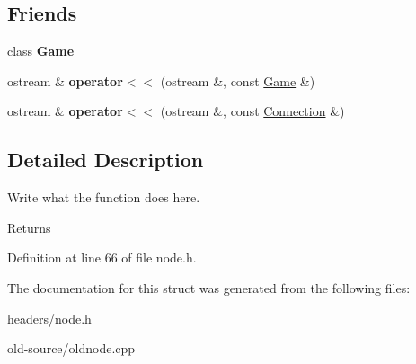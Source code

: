 \subsection*{Friends}
\begin{DoxyCompactItemize}
\item 
\hypertarget{classNode_aa2fab026580d6f14280c2ffb8063a314}{class {\bfseries Game}}\label{classNode_aa2fab026580d6f14280c2ffb8063a314}

\item 
\hypertarget{classNode_a7bb9176e07b6f6c73c930dba6400265f}{ostream \& {\bfseries operator$<$$<$} (ostream \&, const \hyperlink{classGame}{Game} \&)}\label{classNode_a7bb9176e07b6f6c73c930dba6400265f}

\item 
\hypertarget{classNode_a43649da031123d524f6605d2b0b4ebc8}{ostream \& {\bfseries operator$<$$<$} (ostream \&, const \hyperlink{structConnection}{Connection} \&)}\label{classNode_a43649da031123d524f6605d2b0b4ebc8}

\end{DoxyCompactItemize}


\subsection{Detailed Description}
Write what the function does here. 

\begin{DoxyReturn}{Returns}

\end{DoxyReturn}


Definition at line 66 of file node.\+h.



The documentation for this struct was generated from the following files\+:\begin{DoxyCompactItemize}
\item 
headers/node.\+h\item 
old-\/source/oldnode.\+cpp\end{DoxyCompactItemize}
